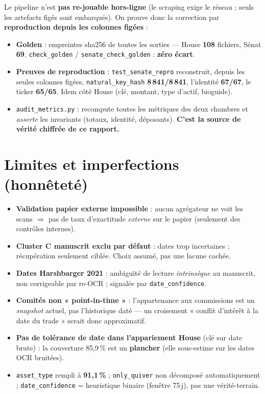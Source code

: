 \documentclass[11pt,a4paper]{article}
\newcommand{\code}[1]{\texttt{\small #1}}
\begin{document}
Le pipeline n'est \textbf{pas re-jouable hors-ligne} (le scraping exige le réseau ; seuls les artefacts
figés sont embarqués). On prouve donc la correction par \textbf{reproduction depuis les colonnes figées} :

\begin{itemize}[nosep,leftmargin=1.4em]
\item \textbf{Golden} : empreintes sha256 de toutes les sorties --- House \textbf{108} fichiers, Sénat
\textbf{69}. \code{check\_golden} / \code{senate\_check\_golden} : \textbf{zéro écart}.
\item \textbf{Preuves de reproduction} : \code{test\_senate\_repro} reconstruit, depuis les seules
colonnes figées, \code{natural\_key\_hash} \textbf{8\,841/8\,841}, l'identité \textbf{67/67}, le ticker
\textbf{65/65}. Idem côté House (clé, montant, type d'actif, bioguide).
\item \code{audit\_metrics.py} : recompute toutes les métriques des deux chambres et \emph{asserte} les
invariants (totaux, identité, déposants). \textbf{C'est la source de vérité chiffrée de ce rapport.}
\end{itemize}

\section{Limites et imperfections (honnêteté)}

\begin{itemize}[nosep,leftmargin=1.4em]
\item \textbf{Validation papier externe impossible} : aucun agrégateur ne voit les scans $\Rightarrow$
pas de taux d'exactitude \emph{externe} sur le papier (seulement des contrôles internes).
\item \textbf{Cluster C manuscrit exclu par défaut} : dates trop incertaines ; récupération seulement
ciblée. Choix assumé, pas une lacune cachée.
\item \textbf{Dates Harshbarger 2021} : ambiguïté de lecture \emph{intrinsèque} au manuscrit, non
corrigeable par re-OCR ; signalée par \code{date\_confidence}.
\item \textbf{Comités non « point-in-time »} : l'appartenance aux commissions est un \emph{snapshot}
actuel, pas l'historique daté --- un croisement « conflit d'intérêt à la date du trade » serait donc
approximatif.
\item \textbf{Pas de tolérance de date dans l'appariement House} (clé sur date brute) : la couverture
85,9\,\% est un \textbf{plancher} (elle sous-estime sur les dates OCR bruitées).
\item \code{asset\_type} rempli à \textbf{91,1\,\%} ; \code{only\_quiver} non décomposé automatiquement ;
\code{date\_confidence} = heuristique binaire (fenêtre 75\,j), pas une vérité-terrain.
\end{itemize}
\end{document}
